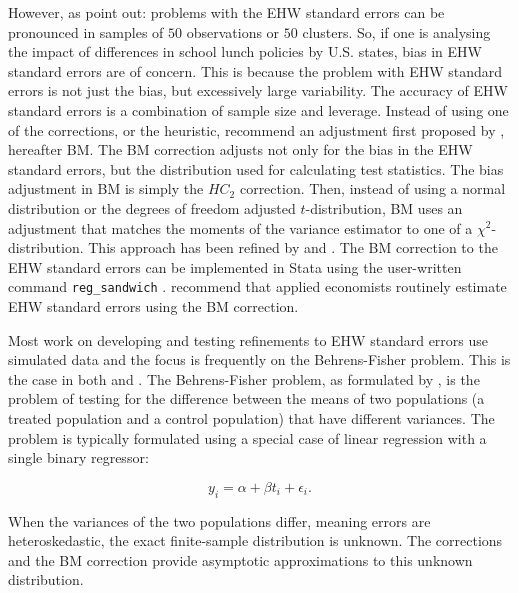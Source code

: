 \documentclass[11pt]{article}
\begin{document}
However, as \cite{imbens_robust_2016} point out: problems with the EHW standard errors can be pronounced in samples of $50$ observations or $50$ clusters. So, if one is analysing the impact of differences in school lunch policies by U.S. states, bias in EHW standard errors are of concern. This is because the problem with EHW standard errors is not just the bias, but excessively large variability. The accuracy of EHW standard errors is a combination of sample size and leverage. Instead of using one of the \cite{mackinnon_heteroskedasticity-consistent_1985} corrections, or the \cite{angrist_mostly_2009} heuristic, \cite{imbens_robust_2016} recommend an adjustment first proposed by \cite{bell_bias_2002}, hereafter BM. The BM correction adjusts not only for the bias in the EHW standard errors, but the distribution used for calculating test statistics. The bias adjustment in BM is simply the $HC_2$ correction. Then, instead of using a normal distribution or the degrees of freedom adjusted $t$-distribution, BM uses an adjustment that matches the moments of the variance estimator to one of a $\chi^2$-distribution. This approach has been refined by \cite{tipton_small-sample_2015} and \cite{pustejovsky_small-sample_2018}. The BM correction to the EHW standard errors can be implemented in Stata using the user-written command \texttt{reg\_sandwich} \citep{tyszler_reg_sandwich_2017}. \cite{imbens_robust_2016} recommend that applied economists routinely estimate EHW standard errors using the BM correction.

Most work on developing and testing refinements to EHW standard errors use simulated data and the focus is frequently on the Behrens-Fisher problem. This is the case in both \cite{angrist_mostly_2009} and \cite{imbens_robust_2016}. The Behrens-Fisher problem, as formulated by \cite{deaton_instruments_2010}, is the problem of testing for the difference between the means of two populations (a treated population and a control population) that have different variances. The problem is typically formulated using a special case of linear regression with a single binary regressor:

\begin{equation}
    y_i = \alpha + \beta t_i + \epsilon_i .
\end{equation}

\noindent When the variances of the two populations differ, meaning errors are heteroskedastic, the exact finite-sample distribution is unknown. The \cite{mackinnon_heteroskedasticity-consistent_1985} corrections and the BM correction provide asymptotic approximations to this unknown distribution.
\end{document}
